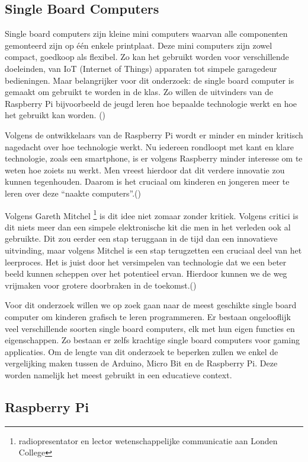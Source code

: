\subsection{Single Board Computers}

Single board computers zijn kleine mini computers waarvan alle componenten gemonteerd zijn op één enkele printplaat. Deze mini computers zijn zowel compact, goedkoop als flexibel. Zo kan het gebruikt worden voor verschillende doeleinden, van IoT (Internet of Things) apparaten tot simpele garagedeur bedieningen. Maar belangrijker voor dit onderzoek: de single board computer is gemaakt om gebruikt te worden in de klas. Zo willen de uitvinders van de Raspberry Pi bijvoorbeeld de jeugd leren hoe bepaalde technologie werkt en hoe het gebruikt kan worden.
(\cite{ET2012})

Volgens de ontwikkelaars van de Raspberry Pi wordt er minder en minder kritisch nagedacht over hoe technologie werkt. Nu iedereen rondloopt met kant en klare technologie, zoals een smartphone, is er volgens Raspberry minder interesse om te weten hoe zoiets nu werkt. Men vreest hierdoor dat dit verdere innovatie zou kunnen tegenhouden. Daarom is het cruciaal om kinderen en jongeren meer te leren over deze “naakte computers”.(\cite{ET2012})

Volgens Gareth Mitchel \footnote{radiopresentator en lector wetenschappelijke communicatie aan Londen College} is dit idee niet zomaar zonder kritiek. Volgens critici is dit niets meer dan een simpele elektronische kit die men in het verleden ook al gebruikte. Dit zou eerder een stap teruggaan in de tijd dan een innovatieve uitvinding, maar volgens Mitchel is een stap terugzetten een cruciaal deel van het leerproces. Het is juist door het versimpelen van technologie dat we een beter beeld kunnen scheppen over het potentieel ervan. Hierdoor kunnen we de weg vrijmaken voor grotere doorbraken in de toekomst.(\cite{ET2012})

Voor dit onderzoek willen we op zoek gaan naar de meest geschikte single board computer om kinderen grafisch te leren programmeren. Er bestaan ongelooflijk veel verschillende soorten single board computers, elk met hun eigen functies en eigenschappen. Zo bestaan er zelfs krachtige single board computers voor gaming applicaties. Om de lengte van dit onderzoek te beperken zullen we enkel de vergelijking maken tussen de Arduino, Micro Bit en de Raspberry Pi. Deze worden namelijk het meest gebruikt in een educatieve context.

\subsection{Raspberry Pi }

